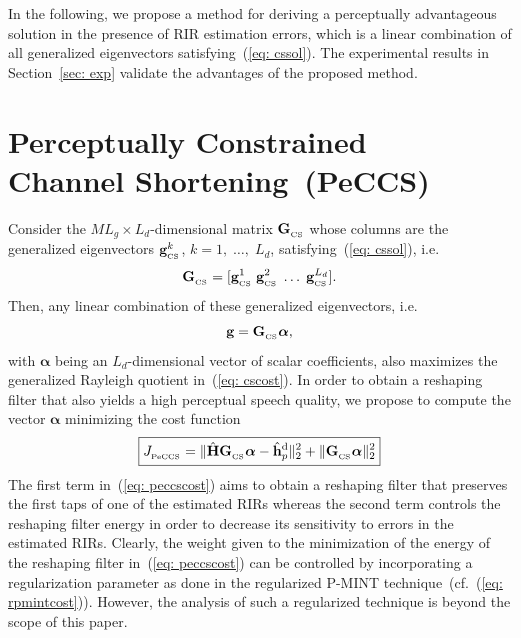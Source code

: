 \documentclass{article}
\begin{document}
In the following, we propose a method for deriving a perceptually advantageous solution in the presence of RIR estimation errors, which is a linear combination of all generalized eigenvectors satisfying~(\ref{eq: cssol}).
The experimental results in Section~\ref{sec: exp} validate the advantages of the proposed method.

\section{Perceptually Constrained \\ Channel Shortening~(PeCCS)}
Consider the $ML_g \times L_d$-dimensional matrix $\mathbf{G}_{_{\rm CS}}$ whose columns are the generalized eigenvectors $\mathbf{g}_{_{\rm CS}}^k$, $k= 1, \; \ldots, \; L_d$, satisfying~(\ref{eq: cssol}), i.e.
\begin{equation}
  \mathbf{G}_{_{\rm CS}} = [\mathbf{g}_{_{\rm CS}}^1 \; \mathbf{g}_{_{\rm CS}}^2 \; \ldots \; \mathbf{g}_{_{\rm CS}}^{L_d}].
\end{equation}
Then, any linear combination of these generalized eigenvectors, i.e.
\begin{equation}
  \label{eq: lc}
  \mathbf{g} = \mathbf{G}_{_{\rm CS}}\boldsymbol\alpha,
\end{equation}
with $\boldsymbol \alpha$ being an $L_d$-dimensional vector of scalar coefficients, also maximizes the generalized Rayleigh quotient in~(\ref{eq: cscost}).
In order to obtain a reshaping filter that also yields a high perceptual speech quality, we propose to compute the vector $\boldsymbol \alpha$ minimizing the cost function
\begin{equation}
  \label{eq: peccscost}
 \boxed{J_{_{\rm PeCCS}} =  \|\hat{\mathbf{H}}\mathbf{G}_{_{\rm CS}} \boldsymbol \alpha - \hat{\mathbf{h}}_p^{\rm d} \|_2^2 + \|\mathbf{G}_{_{\rm CS}}\boldsymbol \alpha \|_2^2}
\end{equation}
The first term in~(\ref{eq: peccscost}) aims to obtain a reshaping filter that preserves the first taps of one of the estimated RIRs whereas the second term controls the reshaping filter energy in order to decrease its sensitivity to errors in the estimated RIRs.
Clearly, the weight given to the minimization of the energy of the reshaping filter in~(\ref{eq: peccscost}) can be controlled by incorporating a regularization parameter as done in the regularized P-MINT technique~(cf.~(\ref{eq: rpmintcost})).
However, the analysis of such a regularized technique is beyond the scope of this paper.
\end{document}
